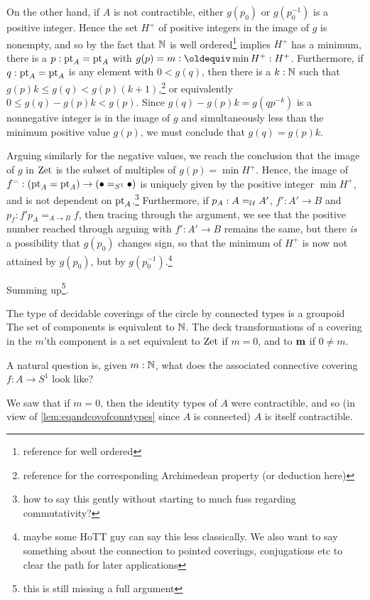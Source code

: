 On the other hand, if $A$ is not contractible, either $g(p_0)$ or $g(p_0^{-1})$ is a positive integer.  Hence the set $H^+$ of positive integers in the image of $g$ is nonempty, and so by the fact that $\mathbb{N}$ is well ordered\footnote{reference for well ordered} implies $H^+$ has a minimum, \ie there is a $p:{\mathord{\mathrm{pt}}}_A={\mathord{\mathrm{pt}}}_A$ with  $g(p)=m\defequi\min H^+:H^+$.  Furthermore, if $q:{\mathord{\mathrm{pt}}}_A={\mathord{\mathrm{pt}}}_A$ is any element with $0<g(q)$, then  there is a $k:\mathbb{N}$ such that $g(p)k\leq g(q)<g(p)(k+1)$,\footnote{reference for the corresponding Archimedean property (or deduction here)} or equivalently $0\leq g(q)-g(p)k< g(p)$.  Since $g(q)-g(p)k=g(qp^{-k})$ is a nonnegative integer is in the image of $g$ and simultaneously less than the minimum positive value $g(p)$, we must conclude that $g(q)=g(p)k$.

Arguing similarly for the negative values, we reach the conclusion that the image of $g$ in $\mathrm{Zet}$ is the subset of multiples of $g(p)=\min H^+$.  Hence, the image of $f^=:({\mathord{\mathrm{pt}}}_A={\mathord{\mathrm{pt}}}_A)\to(\bullet=_{S^1}\bullet)$ is uniquely given by the positive integer $\min H^+$, and is not dependent on ${\mathord{\mathrm{pt}}}_A$.\footnote{how to say this gently without starting to much fuss regarding commutativity?}  Furthermore, if $p_A:A=_{\mathcal{U}}A'$, $f':A'\to B$ and $p_f:f'p_A=_{A\to B}f$, then tracing through the argument, we see that the positive number reached through arguing with $f':A'\to B$ remains the same, but there \emph{is} a possibility that $g(p_0)$ changes sign, so that the minimum of $H^+$ is now not attained by $g(p_0)$, but by $g(p_0^{-1})$.\footnote{maybe some HoTT guy can say this less classically.  We also want to say something about the connection to pointed coverings, conjugations etc to clear the path for later applications}

Summing up\footnote{this is still missing a full argument}.
\begin{theorem}
  \label{thm:coveringsofS1}
  The type of decidable coverings of the circle by connected types is a groupoid 
  The set of components is equivalent to $\mathbb{N}$.  
  The deck transformations of a covering in the $m$'th component is a set equivalent to $\mathrm{Zet}$ if $m=0$, and to $\mathbf{m}$ if $0\neq m$.
\end{theorem}

A natural question is, given $m:\mathbb{N}$, what does the associated connective covering $f:A\to S^1$ look like?

We saw that if $m=0$, then the identity types of $A$ were contractible, and so (in view of \cref{lem:eqandcovofconntypes} since $A$ is connected) $A$ is itself contractible.


